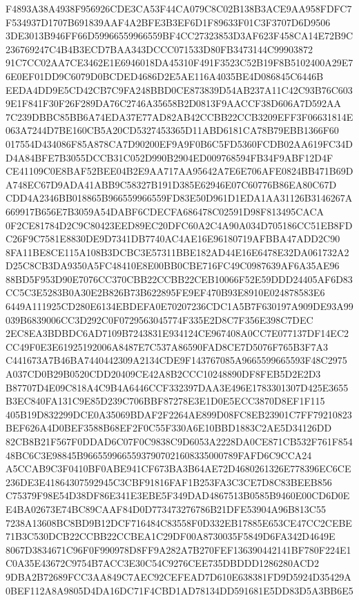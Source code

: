 \documentclass[UTF8,fontset=fandol,zihao=-4,a4paper]{ctexart}
\begin{document}
{{F4893A38A4938F956926CDE3CA53F44CA079C8C02B138B3ACE9AA958FDFC7F534937D1707B691839AAF4A2BFE3B3EF6D1F89633F01C3F3707D6D9506
3DE3013B946FF66D59966559966559BF4CC27323853D3AF623F458CA14E72B9C236769247C4B4B3ECD7BAA343DCCC071533D80FB3473144C99903872
91C7CC02AA7CE3462E1E6946018DA45310F491F3523C52B19F8B5102400A29E76E0EF01DD9C6079D0BCDED4686D2E5AE116A4035BE4D086845C6446B
EEDA4DD9E5CD42CB7C9FA248BBD0CE873839D54AB237A11C42C93B76C6039E1F841F30F26F289DA76C2746A35658B2D0813F9AACCF38D606A7D592AA
7C239DBBC85BB6A74EDA37E77AD82AB42CCBB22CCB3209EFF3F06631814E063A7244D7BE160CB5A20CD5327453365D11ABD6181CA78B79EBB1366F60
017554D434086F85A878CA7D90200EF9A9F0B6C5FD5360FCDB02AA619FC34DD4A84BFE7B3055DCCB31C052D990B2904ED009768594FB34F9ABF12D4F
CE41109C0E8BAF52BEE04B2E9AA717AA95642A7E6E706AFE0824BB471B69DA748EC67D9ADA41ABB9C58327B191D385E62946E07C60776B86EA80C67D
CDD4A2346BB018865B966559966559FD83E50D961D1EDA1AA31126B3146267A669917B656E7B3059A54DABF6CDECFA686478C02591D98F813495CACA
0F2CE81784D2C9C80423EED89EC20DFC60A2C4A90A034D705186CC51EB8FDC26F9C7581E8830DE9D7341DB7740AC4AE16E96180719AFBBA47ADD2C90
8FA11BE8CE115A108B3DCBC3E57311BBE182AD44E16E6478E32DA061732A2D25C8CB3DA9350A5FC48410E8E00BB0CBE716FC49C0987639AF6A35AE96
88BD5F953D90E7076CC370CBB22CCBB22CEB10066F52E59DDD24405AF6D83CC5C3E5283B0A30E2B826B73B622895FE9EF470B93E8910E024878583E6
6449A111925CD280E6134EBDEFA0E70207236CDC1A5B7F630197A909DE93A99039B6839006CC3D292C0F0729563045774F335E2D8C7F356E398C7DEC
2EC8EA3BDBDC6AD7109B7243831E934124CE967408A0CC7E077137DF14EC2CC49F0E3E61925192006A8487E7C537A86590FAD8CE7D5076F765B3F7A3
C441673A7B46BA7440442309A2134CDE9F143767085A9665599665593F48C2975A037CD0B29B0520CDD20409CE42A8B2CCC10248890DF8FEB5D2E2D3
B87707D4E09C818A4C9B4A6446CCF332397DAA3E496E1783301307D425E3655B3EC840FA131C9E85D239C706BBF87278E3E1D0E5ECC3870D8EF1F115
405B19D832299DCE0A35069BDAF2F2264AE899D08FC8EB23901C7FF79210823BEF626A4D0BEF3588B68EF2F0C55F330A6E10BBD1883C2AE5D34126DD
82CB8B21F567F0DDAD6C07F0C9838C9D6053A2228DA0CE871CB532F761F85448BC6C3E98845B96655996655937907021608335000789FAFD6C9CCA24
A5CCAB9C3F0410BF0ABE941CF673BA3B64AE72D4680261326E778396EC6CE236DE3E41864307592945C3CBF91816FAF1B253FA3C3CE7D8C83BEEB856
C75379F98E54D38DF86E341E3EBE5F349DAD4867513B0585B9460E00CD6D0EE4BA02673E74BC89CAAF84D0D773473276786B21DFE53904A96B813C55
7238A13608BC8BD9B12DCF716484C83558F0D332EB17885E653CE47CC2CEBE71B3C530DCB22CCBB22CCBEA1C29DF00A8730035F5849D6FA342D4649E
8067D3834671C96F0F990978D8FF9A282A7B270FEF136390442141BF780F224E1C0A35E43672C9754B7ACC3E30C54C9276CEE735DBDDD1286280ACD2
9DBA2B72689FCC3AA849C7AEC92CEFEAD7D610E638381FD9D5924D35429A0BEF112A8A9805D4DA16DC71F4CBD1AD78134DD591681E5DD83D5A3BB6E5
}}
\end{document}
